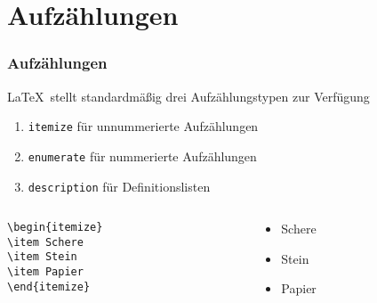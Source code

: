 \section{Aufzählungen}
%
\begin{frame}[fragile]
  \frametitle{Aufzählungen}

  \LaTeX\ stellt standardmäßig drei Aufzählungstypen zur Verfügung%

  \onslide<+->

  \begin{enumerate}
  \item<+-> \lstinline{itemize} für unnummerierte Aufzählungen
  \item<+-> \lstinline{enumerate} für nummerierte Aufzählungen
  \item<+-> \lstinline{description} für Definitionslisten
  \end{enumerate}

  \onslide<+->

  \begin{Beispiel}
    \begin{columns}
      \begin{column}{0.4\linewidth}
\begin{lstlisting}
\begin{itemize}
\item Schere
\item Stein
\item Papier
\end{itemize}
\end{lstlisting}
      \end{column}
      \onslide<+->
      \begin{column}{0.4\linewidth}
        \begin{itemize}
        \item Schere
        \item Stein
        \item Papier
        \end{itemize}
      \end{column}
    \end{columns}
  \end{Beispiel}

\end{frame}

